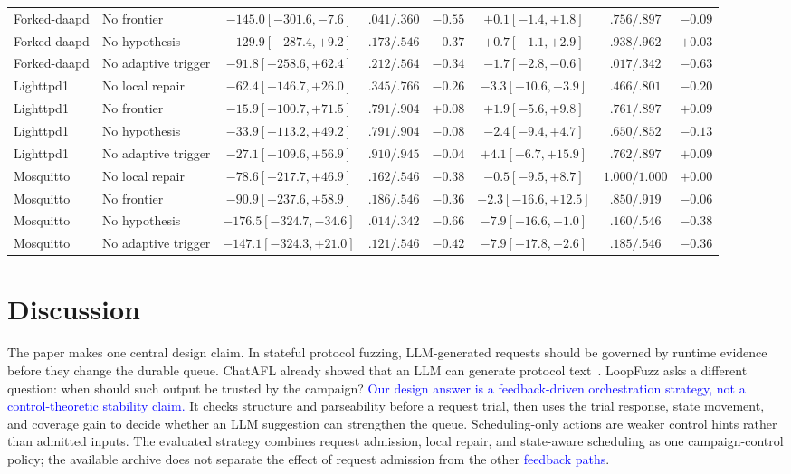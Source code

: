 \documentclass[final,5p,times,number]{elsarticle}
\begin{document}
\begin{table}[!t]
{{\begin{tabular}{l l c c c c c c}
Forked-daapd & No frontier & $-145.0 [-301.6,-7.6]$ & $.041/.360$ & $-0.55$ & $+0.1 [-1.4,+1.8]$ & $.756/.897$ & $-0.09$ \\
Forked-daapd & No hypothesis & $-129.9 [-287.4,+9.2]$ & $.173/.546$ & $-0.37$ & $+0.7 [-1.1,+2.9]$ & $.938/.962$ & $+0.03$ \\
Forked-daapd & No adaptive trigger & $-91.8 [-258.6,+62.4]$ & $.212/.564$ & $-0.34$ & $-1.7 [-2.8,-0.6]$ & $.017/.342$ & $-0.63$ \\
Lighttpd1 & No local repair & $-62.4 [-146.7,+26.0]$ & $.345/.766$ & $-0.26$ & $-3.3 [-10.6,+3.9]$ & $.466/.801$ & $-0.20$ \\
Lighttpd1 & No frontier & $-15.9 [-100.7,+71.5]$ & $.791/.904$ & $+0.08$ & $+1.9 [-5.6,+9.8]$ & $.761/.897$ & $+0.09$ \\
Lighttpd1 & No hypothesis & $-33.9 [-113.2,+49.2]$ & $.791/.904$ & $-0.08$ & $-2.4 [-9.4,+4.7]$ & $.650/.852$ & $-0.13$ \\
Lighttpd1 & No adaptive trigger & $-27.1 [-109.6,+56.9]$ & $.910/.945$ & $-0.04$ & $+4.1 [-6.7,+15.9]$ & $.762/.897$ & $+0.09$ \\
Mosquitto & No local repair & $-78.6 [-217.7,+46.9]$ & $.162/.546$ & $-0.38$ & $-0.5 [-9.5,+8.7]$ & $1.000/1.000$ & $+0.00$ \\
Mosquitto & No frontier & $-90.9 [-237.6,+58.9]$ & $.186/.546$ & $-0.36$ & $-2.3 [-16.6,+12.5]$ & $.850/.919$ & $-0.06$ \\
Mosquitto & No hypothesis & $-176.5 [-324.7,-34.6]$ & $.014/.342$ & $-0.66$ & $-7.9 [-16.6,+1.0]$ & $.160/.546$ & $-0.38$ \\
Mosquitto & No adaptive trigger & $-147.1 [-324.3,+21.0]$ & $.121/.546$ & $-0.42$ & $-7.9 [-17.8,+2.6]$ & $.185/.546$ & $-0.36$ \\
\bottomrule
\end{tabular}}
}
\end{table}

\section{Discussion}

The paper makes one central design claim. In stateful protocol fuzzing, LLM-generated requests should be governed by runtime evidence before they change the durable queue. ChatAFL already showed that an LLM can generate protocol text~\cite{chatafl}. LoopFuzz asks a different question: when should such output be trusted by the campaign? \textcolor{blue}{Our design answer is a feedback-driven orchestration strategy, not a control-theoretic stability claim.} It checks structure and parseability before a request trial, then uses the trial response, state movement, and coverage gain to decide whether an LLM suggestion can strengthen the queue. Scheduling-only actions are weaker control hints rather than admitted inputs. The evaluated strategy combines request admission, local repair, and state-aware scheduling as one campaign-control policy; the available archive does not separate the effect of request admission from the other \textcolor{blue}{feedback paths}.
\end{document}

